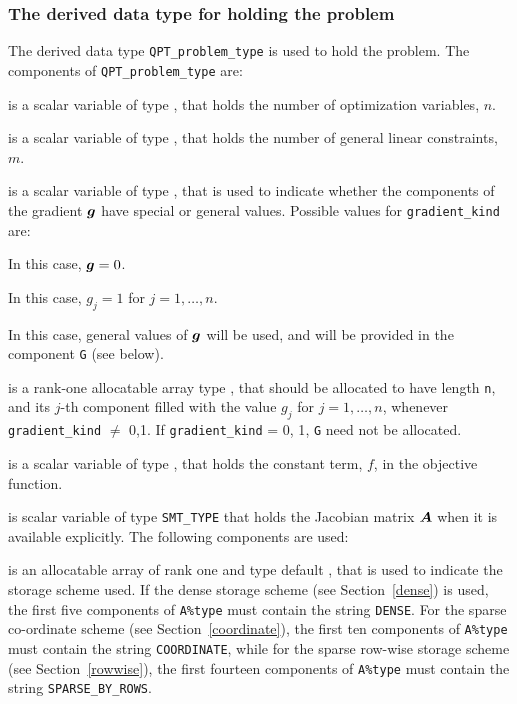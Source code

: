 \documentclass{galahad}
\begin{document}

\subsubsection{The derived data type for holding the problem}\label{typeprob}
The derived data type {\tt QPT\_problem\_type} is used to hold
the problem. The components of
{\tt QPT\_problem\_type}
are:

\begin{description}

 is a scalar variable of type \integer,
 that holds the number of optimization variables, $n$.

 is a scalar variable of type \integer,
 that holds the number of general linear constraints, $m$.

 is a scalar variable of type \integer,
that is used to indicate whether the components of the gradient ${\bm{g}}$
have special or general values. Possible values for {\tt gradient\_kind} are:
\begin{description}
  In this case, ${\bm{g}} = 0$.

 In this case, $g_{j} = 1$ for $j = 1, \ldots , n$.

 In this case, general values of ${\bm{g}}$ will be used,
     and will be provided in the component {\tt G} (see below).
\end{description}

 is a rank-one allocatable array type \realdp, that
should be allocated to have length {\tt n}, and its $j$-th component
filled with the value $g_{j}$ for $j = 1, \ldots , n$,
whenever {\tt gradient\_kind} $\neq$ 0,1.
If {\tt gradient\_kind} {= 0, 1}, {\tt G} need not be allocated.

 is a scalar variable of type
\realdp, that holds
the constant term, $f$, in the objective function.

 is scalar variable of type {\tt SMT\_TYPE}
that holds the Jacobian matrix ${\bm{A}}$ when it is available explicitly.
The following components are used:

\begin{description}

 is an allocatable array of rank one and type default \character,
that is used to indicate the storage scheme used. If the dense storage scheme
(see Section~\ref{dense}) is used,
the first five components of {\tt A\%type} must contain the
string {\tt DENSE}.
For the sparse co-ordinate scheme (see Section~\ref{coordinate}),
the first ten components of {\tt A\%type} must contain the
string {\tt COORDINATE}, while
for the sparse row-wise storage scheme (see Section~\ref{rowwise}),
the first fourteen components of {\tt A\%type} must contain the
string {\tt SPARSE\_BY\_ROWS}.


\end{description}
\end{description}
\end{document}
